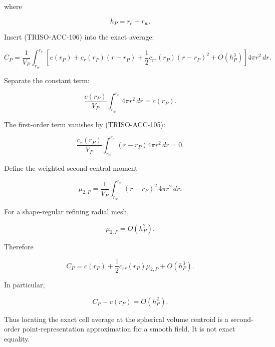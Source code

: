 \documentclass[11pt,a4paper]{article}
\begin{document}
where

\begin{equation}
h_P=r_e-r_w.
\tag{TRISO-ACC-107}
\label{eq:triso-acc-107}
\end{equation}

Insert (TRISO-ACC-106) into the exact average:

\begin{equation}
C_P
=
\frac1{V_P}
\int_{r_w}^{r_e}
\left[
c(r_P)
+
c_r(r_P)(r-r_P)
+
\frac12c_{rr}(r_P)(r-r_P)^2
+
O(h_P^3)
\right]
4\pi r^2\,dr.
\tag{TRISO-ACC-108}
\label{eq:triso-acc-108}
\end{equation}

Separate the constant term:

\begin{equation}
\frac{c(r_P)}{V_P}
\int_{r_w}^{r_e}4\pi r^2\,dr
=
c(r_P).
\tag{TRISO-ACC-109}
\label{eq:triso-acc-109}
\end{equation}

The first-order term vanishes by (TRISO-ACC-105):

\begin{equation}
\frac{c_r(r_P)}{V_P}
\int_{r_w}^{r_e}
(r-r_P)4\pi r^2\,dr
=
0.
\tag{TRISO-ACC-110}
\label{eq:triso-acc-110}
\end{equation}

Define the weighted second central moment

\begin{equation}
\mu_{2,P}
=
\frac1{V_P}
\int_{r_w}^{r_e}
(r-r_P)^2\,4\pi r^2\,dr.
\tag{TRISO-ACC-111}
\label{eq:triso-acc-111}
\end{equation}

For a shape-regular refining radial mesh,

\begin{equation}
\mu_{2,P}=O(h_P^2).
\tag{TRISO-ACC-112}
\label{eq:triso-acc-112}
\end{equation}

Therefore

\begin{equation}
\boxed{
C_P
=
c(r_P)
+
\frac12c_{rr}(r_P)\mu_{2,P}
+
O(h_P^3).
}
\tag{TRISO-ACC-113}
\label{eq:triso-acc-113}
\end{equation}

In particular,

\begin{equation}
\boxed{
C_P-c(r_P)=O(h_P^2).
}
\tag{TRISO-ACC-114}
\label{eq:triso-acc-114}
\end{equation}

Thus locating the exact cell average at the spherical volume centroid is a second-order point-representation approximation for a smooth field. It is not exact equality.
\end{document}
